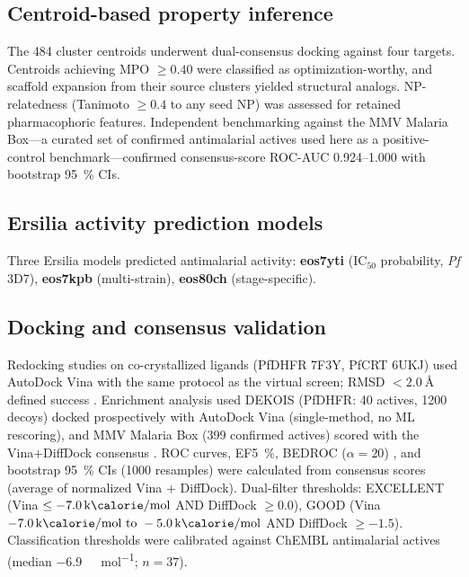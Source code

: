 \documentclass[journal=jcisd8,manuscript=article]{achemso}
\begin{document}
\subsection{Centroid-based property inference}
\label{sec:centroid_inference}

The \num{484} cluster centroids underwent dual-consensus docking against four targets. Centroids achieving MPO $\geq \num{0.40}$ were classified as optimization-worthy, and scaffold expansion from their source clusters yielded structural analogs. NP-relatedness (Tanimoto $\geq \num{0.4}$ to any seed NP) was assessed for retained pharmacophoric features. Independent benchmarking against the MMV Malaria Box---a curated set of confirmed antimalarial actives used here as a positive-control benchmark---confirmed consensus-score ROC-AUC \numrange{0.924}{1.000} with bootstrap \qty{95}{\percent} CIs.

\subsection{Ersilia activity prediction models}

Three Ersilia models \cite{Turon2025} predicted antimalarial activity: \textbf{eos7yti} ($\text{IC}_{50}$ probability, \emph{Pf} 3D7), \textbf{eos7kpb} (multi-strain), \textbf{eos80ch} (stage-specific).

\subsection{Docking and consensus validation}

Redocking studies on co-crystallized ligands (PfDHFR 7F3Y, PfCRT 6UKJ) used AutoDock Vina with the same protocol as the virtual screen; RMSD $< \qty{2.0}{\angstrom}$ defined success \cite{Eberhardt2021}. Enrichment analysis used DEKOIS \cite{Bauer2013} (PfDHFR: 40 actives, 1200 decoys) docked prospectively with AutoDock Vina (single-method, no ML rescoring), and MMV Malaria Box (\num{399} confirmed actives) scored with the Vina+DiffDock consensus \cite{Spangenberg2013}. ROC curves, EF\qty{5}{\percent}, BEDROC ($\alpha=20$) \cite{Truchon2007}, and bootstrap \qty{95}{\percent} CIs (\num{1000} resamples) were calculated from consensus scores (average of normalized Vina + DiffDock). Dual-filter thresholds: EXCELLENT (Vina $\leq \qty{-7.0}{\kilo\calorie\per\mole}$ AND DiffDock $\geq \num{0.0}$), GOOD (Vina $\qtyrange{-7.0}{-5.0}{\kilo\calorie\per\mole}$ AND DiffDock $\geq \num{-1.5}$). Classification thresholds were calibrated against ChEMBL antimalarial actives (median \qty{-6.9}{\kilo\calorie\per\mole}; $n=37$).
\end{document}

